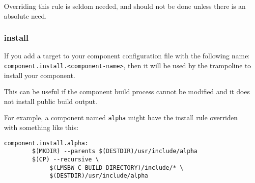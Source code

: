 Overriding this rule is seldom needed, and should not be done unless
there is an absolute need.

\subsubsection{install}\label{wrap:override-target-install}

If you add a \makefile target to your component configuration file
with the following name:
\texttt{component.install.}\texttt{<component-name>}, then it will be
used by the trampoline \makefile to install your component.

This can be useful if the component build process cannot be modified
and it does not install public build output.

For example, a component named \texttt{alpha} might have the install
rule overriden with something like this:

\begin{verbatim}
component.install.alpha:
        $(MKDIR) --parents $(DESTDIR)/usr/include/alpha
        $(CP) --recursive \
             $(LMSBW_C_BUILD_DIRECTORY)/include/* \
             $(DESTDIR)/usr/include/alpha
\end{verbatim}


